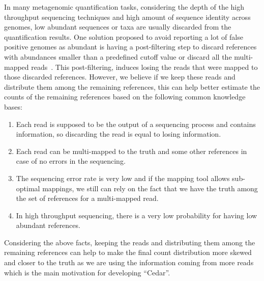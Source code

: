 In many metagenomic quantification tasks,
considering the depth of the high throughput sequencing techniques
and high amount of sequence identity across genomes,
low abundant sequences or taxa are usually discarded from the quantification results.
One solution proposed to avoid reporting a lot of false positive genomes as abundant
is having a post-filtering step
to discard references with abundances smaller than a predefined cutoff value
or discard all the multi-mapped reads~\cite{bracken,karp}.
This post-filtering, induces losing the reads that were mapped to those discarded references.
However, we believe if we keep these reads and distribute them among the remaining references,
this can help better estimate the counts of the remaining references
based on the following common knowledge bases:
\begin{enumerate}
    \item Each read is supposed to be the output of a sequencing process and contains information,
    so discarding the read is equal to losing information.
    \item Each read can be multi-mapped to the truth and some other references
    in case of no errors in the sequencing.
    \item The sequencing error rate is very low and if the mapping tool allows sub-optimal mappings,
    we still can rely on the fact that we have the truth
    among the set of references for a multi-mapped read.
    \item In high throughput sequencing, there is a very low probability for having low abundant references.
\end{enumerate}

Considering the above facts, keeping the reads and
distributing them among the remaining references
can help to make the final count distribution more skewed and closer to the truth
as we are using the information coming from more reads
which is the main motivation for developing ``Cedar''.

